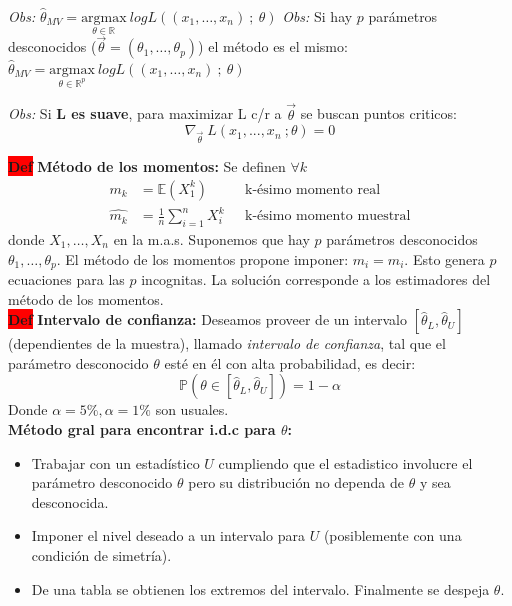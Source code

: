 \documentclass[letterpaper,10.5pt,twocolumn]{article} %
\newcommand{\R}[1][]{\mathbb{R}^{#1}}
\newcommand{\E}{\mathbb{E} }
\newcommand{\Proba}{\mathbb{P} }
\newcommand{\hlc}[2][yellow]{ \colorbox{#1}{#2} }
\newcommand{\Def}{\hlc[red]{\bfseries Def}}
\let\oldfrac=\frac
\renewcommand{\frac}[2]{\ensuremath{\oldfrac{#1}{#2}}}
\begin{document}
\textit{Obs:} $ \hat{\theta}_{MV} = \underset{\theta \in \R}{\textrm{argmax}}\ log L ((x_1, \ldots, x_n)\ ;\ \theta ) $
\textit{Obs:} Si hay $p$ parámetros desconocidos ($\vec{\theta} = (\theta_1, \ldots, \theta_p) $) el método es el mismo: $ \hat{\theta}_{MV} = \underset{\theta \in \R[p] }{\textrm{argmax}}\ log L ((x_1, \ldots, x_n)\ ;\ \theta ) $

\textit{Obs:} Si \textbf{L es suave}, para maximizar L c/r a $\vec{\theta} $ se buscan puntos criticos:
\begin{equation*}
    \nabla_{\vec{\theta}}\ L (x_1, ... , x_n\ ; \theta) = 0
\end{equation*}

\Def \textbf{Método de los momentos:} Se definen $\forall k $
\begin{align*}
    m_k &= \E (X_1^k) \ \ \ &\textrm{k-ésimo momento real} \\
    \hat{m_k} &= \frac{1}{n} \sum_{i=1}^{n} X_i^k \ \ \ &\textrm{k-ésimo momento muestral}
\end{align*}
donde $X_1, \ldots, X_n$ en la m.a.s. Suponemos que hay $p$ parámetros desconocidos $\theta_1, \ldots, \theta_p $. El método de los momentos propone imponer: $m_i = \hat{m}_i $. Esto genera $p$ ecuaciones para las $p$ incognitas. La solución corresponde a los estimadores del método de los momentos.\\

\Def \textbf{Intervalo de confianza:} Deseamos proveer de un intervalo $[\hat{\theta}_L, \hat{\theta}_U ]$ (dependientes de la muestra), llamado \textit{intervalo de confianza}, tal que el parámetro desconocido $\theta$ esté en él con alta probabilidad, es decir:
\begin{equation*}
    \Proba (\theta \in [\hat{\theta}_L, \hat{\theta}_U ]) = 1 - \alpha
\end{equation*}
Donde $\alpha=5\%,\alpha=1\% $ son usuales.\\

\textbf{Método gral para encontrar i.d.c para $\theta$:}
\begin{itemize}
    \item Trabajar con un estadístico $U$ cumpliendo que el estadistico involucre el parámetro desconocido $\theta$ pero su distribución no dependa de $\theta$ y sea desconocida.
    \item Imponer el nivel deseado a un intervalo para $U$ (posiblemente con una condición de simetría).
    \item De una tabla se obtienen los extremos del intervalo. Finalmente se despeja $\theta$.
\end{itemize}
\end{document}
